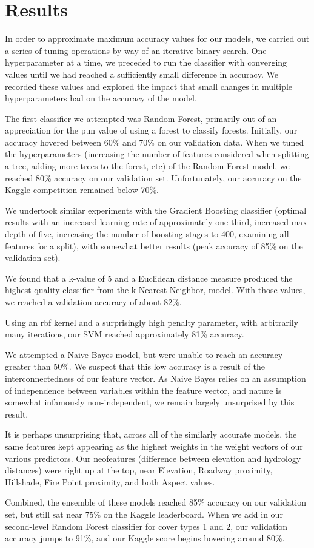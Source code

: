 \section{Results}
\label{sec:-res}
In order to approximate maximum accuracy values for our models, we 
carried out a series of tuning operations by way of an iterative binary 
search.  One hyperparameter at a time, we preceded to run the 
classifier with converging values until we had reached a sufficiently 
small difference in accuracy.  We recorded these values and explored 
the impact that small changes in multiple hyperparameters had on the 
accuracy of the model.  


The first classifier we attempted was Random Forest, primarily out of an 
appreciation for the pun value of using a forest to classify forests. 
Initially, our accuracy hovered between 60\% and 70\% on our validation 
data.  When we tuned the hyperparameters (increasing the number of 
features considered when splitting a tree, adding more trees to the 
forest, etc) of the Random Forest model, we reached 80\% accuracy on 
our validation set.  Unfortunately, our accuracy on the Kaggle 
competition remained below 70\%.  

We undertook similar experiments with the Gradient Boosting classifier 
(optimal results with an increased learning rate of approximately one 
third, increased max depth of five, increasing the number of boosting 
stages to 400, examining all features for a split), with somewhat 
better results (peak accuracy of 85\% on the validation set).  

We found that a k-value of 5 and a Euclidean distance measure
produced the highest-quality classifier from the k-Nearest Neighbor, 
model.  With those values, we reached a validation accuracy of about 
82\%.

Using an rbf kernel and a surprisingly high penalty parameter, with 
arbitrarily many iterations, our SVM reached approximately 81\% 
accuracy.

We attempted a Naive Bayes model, but were unable to reach an accuracy 
greater than 50\%.  We suspect that this low accuracy is a result of 
the interconnectedness of our feature vector.  As Naive Bayes relies on 
an assumption of independence between variables within the feature 
vector, and nature is somewhat infamously non-independent\cite{silent}, 
we remain largely unsurprised by this result.

It is perhaps unsurprising that, across all of the similarly accurate 
models, the same features kept appearing as the highest weights in the 
weight vectors of our various predictors.  Our neofeatures (difference 
between elevation and hydrology distances) were right up at the top, 
near Elevation, Roadway proximity, Hillshade, Fire Point proximity, and 
both Aspect values.

Combined, the ensemble of these models reached 85\% accuracy on our 
validation set, but still sat near 75\% on the Kaggle leaderboard.  
When we add in our second-level Random Forest classifier for cover 
types 1 and 2, our validation accuracy jumps to 91\%, and our Kaggle 
score begins hovering around 80\%.



